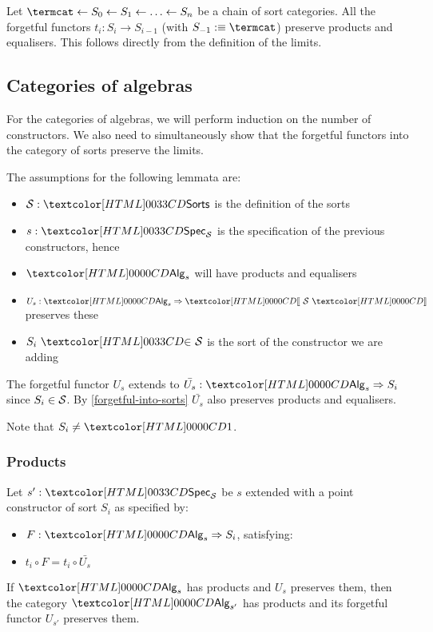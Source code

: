 \begin{remark}
  \label{forgetful-into-sorts}
  Let $\termcat \from S_0 \from S_1 \from \hdots \from S_n$ be a chain
  of sort categories. All the forgetful functors
  $t_i : S_i \to S_{i-1}$ (with $S_{-1} \ddefeq \termcat$) preserve
  products and equalisers. This follows directly from the definition
  of the limits.
\end{remark}

\subsection{Categories of algebras}
For the categories of algebras, we will perform induction on the
number of constructors. We also need to simultaneously show that the
forgetful functors into the category of sorts preserve the limits.

The assumptions for the following lemmata are:
\begin{itemize}
\item $\Ss : \sortsty$ is the definition of the sorts
\item $s : \specty_\Ss$ is the specification of the previous constructors, hence
\item $\Alg_s$ will have products and equalisers
\item $U_s : \Func{\Alg_s}{\SortCat{\Ss}}$ preserves these
\item $\sortsin{S_i}{\Ss}$ is the sort of the constructor we are adding
\end{itemize}

The forgetful functor $U_s$ extends to
$\bar{U_s} : \Func{\Alg_s}{S_i}$ since $S_i \in \mathcal{S}$. By
\cref{forgetful-into-sorts} $\bar{U_s}$ also preserves products and
equalisers.

Note that $S_i \neq \unitty$.

\subsubsection{Products}

\begin{lemma}
  Let $s' : \specty_\Ss$ be $s$ extended with a point constructor of sort
  $S_i$ as specified by:
  \begin{itemize}
  \item $F : \Func{\Alg_s}{S_i}$, satisfying:
  \item $t_i \circ F = t_i \circ \bar{U_s}$
  \end{itemize}

  If $\Alg_s$ has products and $U_s$ preserves them, then the category
  $\Alg_{s'}$ has products and its forgetful functor $U_{s'}$
  preserves them.
\end{lemma}

